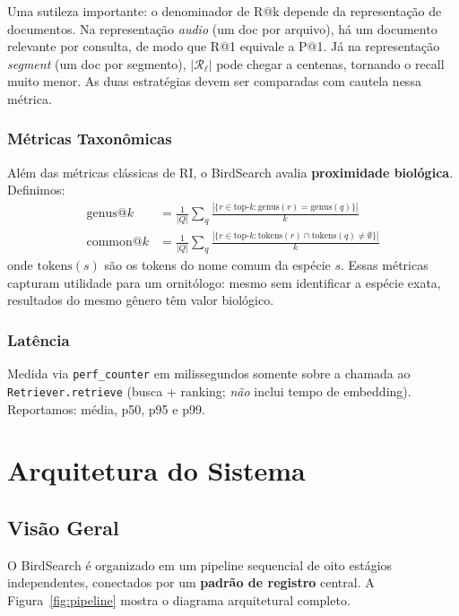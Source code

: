 \documentclass[12pt,a4paper]{article}
\begin{document}
Uma sutileza importante: o denominador de R@k depende da representação
de documentos. Na representação \emph{audio} (um doc por arquivo), há um
documento relevante por consulta, de modo que R@1 equivale a P@1. Já na
representação \emph{segment} (um doc por segmento), $|\mathcal{R}_\ell|$ pode
chegar a centenas, tornando o recall muito menor. As duas estratégias devem
ser comparadas com cautela nessa métrica.

\subsubsection{Métricas Taxonômicas}

Além das métricas clássicas de RI, o BirdSearch avalia \textbf{proximidade
biológica}. Definimos:
\begin{align}
  \text{genus@}k &= \frac{1}{|Q|}\sum_q
    \frac{|\{r \in \text{top-}k : \text{genus}(r) = \text{genus}(q)\}|}{k}
  \label{eq:genusk}\\[4pt]
  \text{common@}k &= \frac{1}{|Q|}\sum_q
    \frac{|\{r \in \text{top-}k : \text{tokens}(r) \cap \text{tokens}(q) \neq \emptyset\}|}{k}
  \label{eq:commonk}
\end{align}
onde $\text{tokens}(s)$ são os tokens do nome comum da espécie $s$. Essas
métricas capturam utilidade para um ornitólogo: mesmo sem identificar a espécie
exata, resultados do mesmo gênero têm valor biológico.

\subsubsection{Latência}

Medida via \texttt{perf\_counter} em milissegundos somente sobre a chamada ao
\texttt{Retriever.retrieve} (busca + ranking; \emph{não} inclui tempo de
embedding). Reportamos: média, p50, p95 e p99.

\section{Arquitetura do Sistema}
\label{sec:arquitetura}

\subsection{Visão Geral}

O BirdSearch é organizado em um pipeline sequencial de oito estágios
independentes, conectados por um \textbf{padrão de registro} central. A
Figura~\ref{fig:pipeline} mostra o diagrama arquitetural completo.
\end{document}
